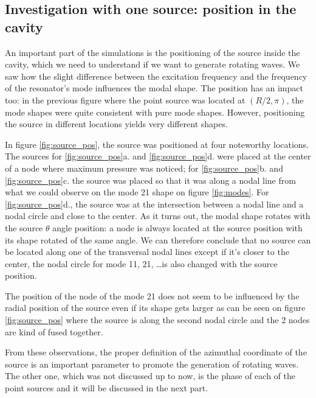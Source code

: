 \documentclass[%
 reprint,
 amsmath,amssymb,
 aps,
]{revtex4-2}
\begin{document}
\subsection{Investigation with one source: position in the cavity}
An important part of the simulations is the positioning of the source inside the cavity, which we need to understand if we want to generate rotating waves. We saw how the slight difference between the excitation frequency and the frequency of the resonator's mode influences the modal shape. The position has an impact too: in the previous figure where the point source was located at $(R/2, \pi)$, the mode shapes were quite consistent with pure mode shapes. However, positioning the source in different locations yields very different shapes.

In figure \ref{fig:source_pos}, the source was positioned at four noteworthy locations. The sources for \ref{fig:source_pos}a. and \ref{fig:source_pos}d. were placed at the center of a node where maximum pressure was noticed; for \ref{fig:source_pos}b. and \ref{fig:source_pos}c. the source was placed so that it was along a nodal line from what we could observe on the mode 21 shape on figure \ref{fig:modes}. For \ref{fig:source_pos}d., the source was at the intersection between a nodal line and a nodal circle and close to the center. As it turns out, the modal shape rotates with the source $\theta$ angle position: a node is always located at the source position with its shape rotated of the same angle. We can therefore conclude that no source can be located along one of the transversal nodal lines except if it's closer to the center, the nodal circle for mode 11, 21, \ldots is also changed with the source position.

The position of the node of the mode 21 does not seem to be influenced by the radial position of the source even if its shape gets larger as can be seen on figure \ref{fig:source_pos} where the source is along the second nodal circle and the 2 nodes are kind of fused together.

From these observations, the proper definition of the azimuthal coordinate of the source is an important parameter to promote the generation of rotating waves. The other one, which was not discussed up to now, is the phase of each of the point sources and it will be discussed in the next part.
\end{document}
